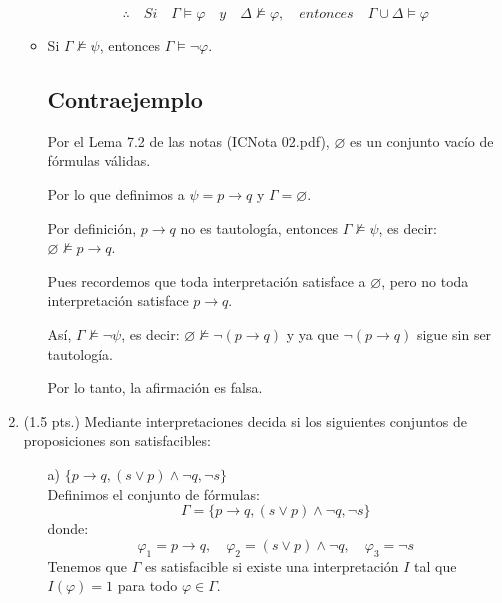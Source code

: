 \documentclass[11pt,letterpaper]{article}
\begin{document}
\begin{enumerate}
\begin{itemize}
      \[
       \therefore \quad Si \quad \Gamma \vDash \varphi \quad y \quad \Delta \nvDash \varphi,\quad entonces \quad \Gamma \cup \Delta \vDash \varphi
      \]
      
    \item Si $\Gamma \nvDash \psi$, entonces $\Gamma \vDash \neg \varphi$.
      
      \subsection*{Contraejemplo}
      
      Por el Lema 7.2 de las notas (ICNota 02.pdf), $\varnothing$ es un conjunto vacío de fórmulas válidas.
      
      Por lo que definimos a  $\psi = p \rightarrow q$ y $\Gamma = \varnothing$.
      
      Por definición, $p \rightarrow q$ no es tautología, entonces $\Gamma \nvDash \psi$, es decir: $\varnothing \nvDash p \rightarrow q$.
      
      Pues recordemos que toda interpretación satisface a $\varnothing$, pero no toda interpretación satisface $p \rightarrow q$.
      
      Así, $\Gamma \nvDash \neg \psi$, es decir: $\varnothing \nvDash \neg (p \rightarrow q)$ y ya que $\neg (p \rightarrow q)$ sigue sin ser tautología.

      Por lo tanto, la afirmación es falsa.
      \bigskip
      
    \end{itemize}

    \bigskip

    \newpage
  \item (1.5 pts.) Mediante interpretaciones decida si los siguientes conjuntos de proposiciones son satisfacibles:
    \begin{itemize}
       \item[a)] $\{ p \rightarrow q, (s \lor p) \land \neg q, \neg s \}$\\
      
         Definimos el conjunto de fórmulas:
         \[
         \Gamma = \{ p \rightarrow q, (s \vee p) \land \neg q, \neg s \}
         \]
         donde:
         \[
         \varphi_1 = p \rightarrow q, \quad \varphi_2 = (s \vee p) \land \neg q, \quad \varphi_3 = \neg s
         \]
         Tenemos que $\Gamma$ es satisfacible si existe una interpretación $I$ tal que $I(\varphi) = 1$ para todo $\varphi \in \Gamma$.\\


\end{itemize}
\end{enumerate}
\end{document}
